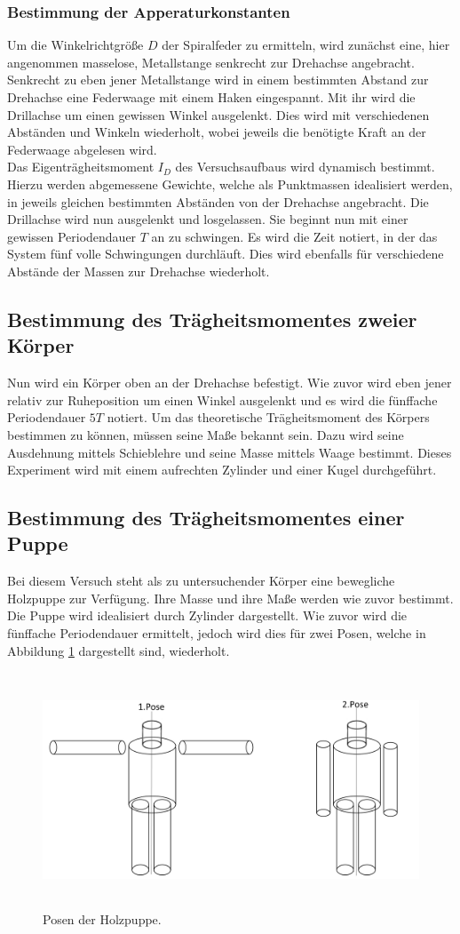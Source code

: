 \subsubsection{Bestimmung der Apperaturkonstanten}
Um die Winkelrichtgröße $D$ der Spiralfeder zu ermitteln, wird zunächst eine, hier angenommen masselose, Metallstange senkrecht zur Drehachse angebracht.
Senkrecht zu eben jener Metallstange wird in einem bestimmten Abstand zur Drehachse eine Federwaage mit einem Haken eingespannt.
Mit ihr wird die Drillachse um einen gewissen Winkel ausgelenkt.
Dies wird mit verschiedenen Abständen und Winkeln wiederholt, wobei jeweils die benötigte Kraft an der Federwaage abgelesen wird.\\
Das Eigenträgheitsmoment $I_{D}$ des Versuchsaufbaus wird dynamisch bestimmt.
Hierzu werden abgemessene Gewichte, welche als Punktmassen idealisiert werden, in jeweils gleichen bestimmten Abständen von der Drehachse angebracht.
Die Drillachse wird nun ausgelenkt und losgelassen.
Sie beginnt nun mit einer gewissen Periodendauer $T$ an zu schwingen.
Es wird die Zeit notiert, in der das System fünf volle Schwingungen durchläuft.
Dies wird ebenfalls für verschiedene Abstände der Massen zur Drehachse wiederholt.

\subsection{Bestimmung des Trägheitsmomentes zweier Körper}
Nun wird ein Körper oben an der Drehachse befestigt.
Wie zuvor wird eben jener relativ zur Ruheposition um einen Winkel ausgelenkt und es wird die fünffache Periodendauer $5T$ notiert.
Um das theoretische Trägheitsmoment des Körpers bestimmen zu können, müssen seine Maße bekannt sein.
Dazu wird seine Ausdehnung mittels Schieblehre und seine Masse mittels Waage bestimmt.
Dieses Experiment wird mit einem aufrechten Zylinder und einer Kugel durchgeführt.

\subsection{Bestimmung des Trägheitsmomentes einer Puppe}
Bei diesem Versuch steht als zu untersuchender Körper eine bewegliche Holzpuppe zur Verfügung.
Ihre Masse und ihre Maße werden wie zuvor bestimmt.
Die Puppe wird idealisiert durch Zylinder dargestellt.
Wie zuvor wird die fünffache Periodendauer ermittelt, jedoch wird dies für zwei Posen, welche in Abbildung \ref{df:2} dargestellt sind, wiederholt.

\begin{figure}
  \centering
  \includegraphics[height=7cm]{Posen.png}
  \caption{Posen der Holzpuppe.}
  \label{df:2}
\end{figure}
